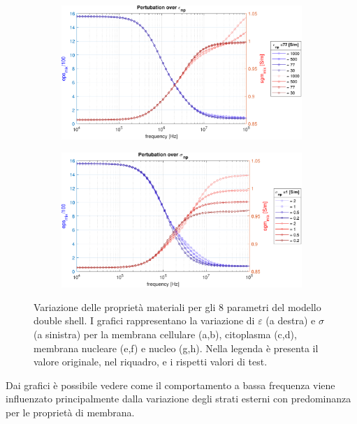\begin{figure}[t!]
\begin{subfigure}{0.5\linewidth}
	\caption{}
	\label{fig:sgmnepert}
\end{subfigure}\vspace{0.6cm}
	\begin{subfigure}{0.5\linewidth}
	\centering
	\includegraphics[width=0.95\linewidth]{../code/figs/eps_np_pert}
	\caption{}
	\label{fig:epsnppert}
\end{subfigure}\hfill
\begin{subfigure}{0.5\linewidth}
	\centering
	\includegraphics[width=0.95\linewidth]{../code/figs/sgm_np_pert}
	\caption{}
	\label{fig:sgmnppert}
\end{subfigure}\hfill
	\caption{Variazione delle proprietà materiali per gli 8 parametri del modello double shell. I grafici rappresentano la variazione di $\varepsilon$ (a destra) e $\sigma$ (a sinistra) per la membrana cellulare (a,b), citoplasma (c,d), membrana nucleare (e,f) e nucleo (g,h). Nella legenda è presenta il valore originale, nel riquadro, e i rispetti valori di test.}
	\label{fig:perturbazioni}
\end{figure}

Dai grafici è possibile vedere come il comportamento a bassa frequenza viene influenzato principalmente dalla variazione degli strati esterni con predominanza per le proprietà di membrana.

